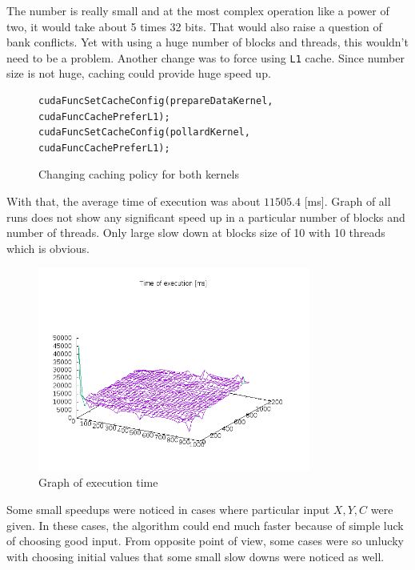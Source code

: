 \documentclass[a4paper]{article}
\begin{document}
The number is really small and at the most complex operation like a power of two, it would take about 5 times 32 bits. That would also raise a question of bank conflicts. Yet with using a huge number of blocks and threads, this wouldn't need to be a problem. Another change was to force using \texttt{L1} cache. Since number size is not huge, caching could provide huge speed up.

 
\begin{figure}[H]
    \centering
    \begin{lstlisting}
cudaFuncSetCacheConfig(prepareDataKernel, cudaFuncCachePreferL1);
cudaFuncSetCacheConfig(pollardKernel, cudaFuncCachePreferL1);
    \end{lstlisting}
    \caption{Changing caching policy for both kernels}
    \label{llcache}
\end{figure}

With that, the average time of execution was about $11505.4$ [ms]. Graph of all runs does not show any significant speed up in a particular number of blocks and number of threads. Only large slow down at blocks size of 10 with 10 threads which is obvious.

\begin{figure}[H]
  \centering
    \includegraphics[width=0.8\textwidth]{graph_v1.png}
  \caption{Graph of execution time}
  \label{exec}
\end{figure}

Some small speedups were noticed in cases where particular input $X, Y, C$ were given. In these cases, the algorithm could end much faster because of simple luck of choosing good input. From opposite point of view, some cases were so unlucky with choosing initial values that some small slow downs were noticed as well.
\end{document}
